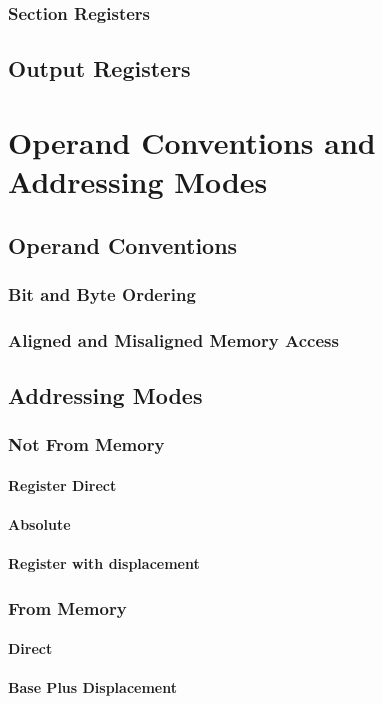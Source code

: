 \documentclass[oneside, a4paper]{memoir}
\begin{document}
\subsection{Section Registers}
\section{Output Registers}

\chapter{Operand Conventions and Addressing Modes}
\section{Operand Conventions}
\subsection{Bit and Byte Ordering}
\subsection{Aligned and Misaligned Memory Access}
\section{Addressing Modes}
\subsection{Not From Memory}
\subsubsection{Register Direct}
\subsubsection{Absolute}
\subsubsection{Register with displacement}
\subsection{From Memory}
\subsubsection{Direct}
\subsubsection{Base Plus Displacement}
\end{document}
